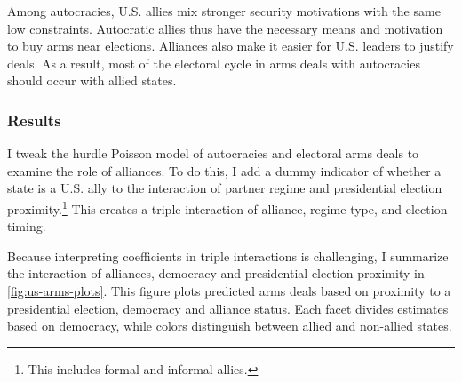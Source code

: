 \documentclass[12pt]{article}
\begin{document}


Among autocracies, U.S. allies mix stronger security motivations with the same low constraints. 
Autocratic allies thus have the necessary means and motivation to buy arms near elections. 
Alliances also make it easier for U.S. leaders to justify deals.
As a result, most of the electoral cycle in arms deals with autocracies should occur with allied states. 
 

 
\subsubsection{Results}

I tweak the hurdle Poisson model of autocracies and electoral arms deals to examine the role of alliances. 
To do this, I add a dummy indicator of whether a state is a U.S. ally to the interaction of partner regime and presidential election proximity.\footnote{This includes formal and informal allies.}
This creates a triple interaction of alliance, regime type, and election timing. 


Because interpreting coefficients in triple interactions is challenging, I summarize the interaction of alliances, democracy and presidential election proximity in \autoref{fig:us-arms-plots}.
This figure plots predicted arms deals based on proximity to a presidential election, democracy and alliance status. 
Each facet divides estimates based on democracy, while colors distinguish between allied and non-allied states. 
\end{document}
